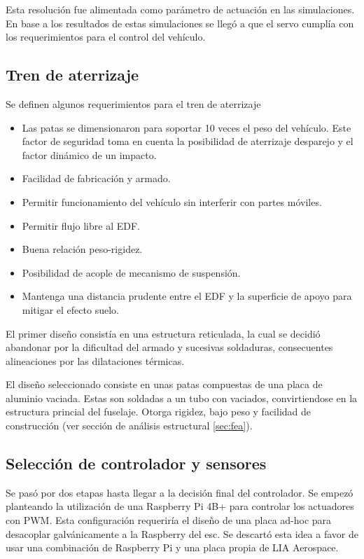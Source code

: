 Esta resolución fue alimentada como parámetro de actuación en las simulaciones. En base a los resultados de estas simulaciones se llegó a que el servo cumplía con los requerimientos para el control del vehículo. 

\subsection{Tren de aterrizaje}
Se definen algunos requerimientos para el tren de aterrizaje
\begin{itemize}
    \item Las patas se dimensionaron para soportar 10 veces el peso del vehículo. Este factor de seguridad toma en cuenta la posibilidad de aterrizaje desparejo y el factor dinámico de un impacto. %
    \item Facilidad de fabricación y armado.
    \item Permitir funcionamiento del vehículo sin interferir con partes móviles.
    \item Permitir flujo libre al EDF.
    \item Buena relación peso-rigidez.
    \item Posibilidad de acople de mecanismo de suspensión.
    \item Mantenga una distancia prudente entre el EDF y la superficie de apoyo para mitigar el efecto suelo.
\end{itemize}

El primer diseño consistía en una estructura reticulada, la cual se decidió abandonar por la dificultad del armado y sucesivas soldaduras, consecuentes alineaciones por las dilataciones térmicas.

\medskip

El diseño seleccionado consiste en unas patas compuestas de una placa de aluminio vaciada. Estas son soldadas a un tubo con vaciados, convirtiendose en la estructura princial del fuselaje. Otorga rigidez, bajo peso y facilidad de construcción (ver sección de análisis estructural \ref{sec:fea}).

\subsection{Selección de controlador y sensores}

Se pasó por dos etapas hasta llegar a la decisión final del controlador. Se empezó planteando la utilización de una Raspberry Pi 4B+ para controlar los actuadores con PWM. Esta configuración requeriría el diseño de una placa ad-hoc para desacoplar galvánicamente a la Raspberry del \gls{esc}. Se descartó esta idea a favor de usar una combinación de Raspberry Pi y una placa propia de LIA Aerospace.

